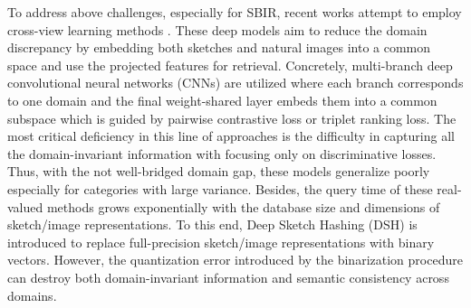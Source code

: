 To address above challenges, especially for SBIR, recent works attempt to employ cross-view learning methods \cite{SaavedraB10,EitzHBA10,LiuSSLS17,SaavedraB15,hu2010,ParuiM14,dalal2005,hu2010_1,Saavedra14,Lowe99}.
These deep models aim to reduce the domain discrepancy by embedding both sketches and natural images into a common space and use the projected features for retrieval.
Concretely, multi-branch deep convolutional neural networks (CNNs) are utilized where each branch corresponds to one domain and the final weight-shared layer embeds them into a common
subspace which is guided by pairwise contrastive loss or triplet ranking loss.
The most critical deficiency in this line of approaches is the difficulty in capturing all the domain-invariant information with focusing only on discriminative losses.
Thus, with the not well-bridged domain gap, these models generalize poorly especially for categories with large variance. 
Besides, the query time of these real-valued methods grows exponentially with the database size and dimensions of sketch/image representations. To this end, Deep Sketch Hashing 
(DSH) \cite{LiuSSLS17} is introduced to replace full-precision sketch/image representations with binary vectors. However, the quantization error introduced 
 by the binarization procedure can destroy both domain-invariant information and semantic consistency across domains. 


